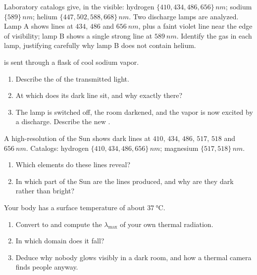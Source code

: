 \begin{exercise}[$\star\star$]\label{exo:g10:light-spectra:8}
Laboratory catalogs give, in the visible: hydrogen
$\{410, 434, 486, 656\}\,\unit{nm}$; sodium $\{589\}\,\unit{nm}$; helium
$\{447, 502, 588, 668\}\,\unit{nm}$. Two discharge lamps are analyzed.
Lamp A shows lines at $434$, $486$ and $\qty{656}{nm}$, plus a faint
violet line near the edge of visibility; lamp B shows a single strong
line at $\qty{589}{nm}$. Identify the gas in each lamp, justifying
carefully why lamp B does not contain helium.
\end{exercise}

\begin{exercise}[$\star\star$]\label{exo:g10:light-spectra:9}
 is sent through a flask of cool sodium vapor.
\begin{enumerate}
  \item Describe the  of the transmitted light.
  \item At which  does its dark line sit, and why exactly
        there?
  \item The lamp is switched off, the room darkened, and the vapor is
        now excited by a discharge. Describe the new .
\end{enumerate}
\end{exercise}

\begin{exercise}[$\star\star$]\label{exo:g10:light-spectra:10}
A high-resolution  of the Sun shows dark lines at $410$, $434$,
$486$, $517$, $518$ and $\qty{656}{nm}$. Catalogs: hydrogen
$\{410, 434, 486, 656\}\,\unit{nm}$; magnesium $\{517, 518\}\,\unit{nm}$.
\begin{enumerate}
  \item Which elements do these lines reveal?
  \item In which part of the Sun are the lines produced, and why are
        they dark rather than bright?
\end{enumerate}
\end{exercise}

\begin{exercise}[$\star\star$]\label{exo:g10:light-spectra:11}
Your body has a surface temperature of about $\qty{37}{\degreeCelsius}$.
\begin{enumerate}
  \item Convert to  and compute the $\lambda_{\max}$ of your own
        thermal radiation.
  \item In which domain does it fall?
  \item Deduce why nobody glows visibly in a dark room, and how a
        thermal camera finds people anyway.
\end{enumerate}
\end{exercise}

